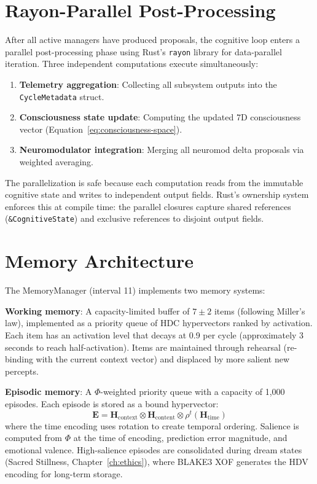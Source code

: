 \documentclass[12pt]{book}
\newcommand{\bind}{\otimes}
\begin{document}
\section{Rayon-Parallel Post-Processing}

After all active managers have produced proposals, the cognitive loop enters a parallel post-processing phase using Rust's \texttt{rayon} library for data-parallel iteration. Three independent computations execute simultaneously:

\begin{enumerate}
  \item \textbf{Telemetry aggregation}: Collecting all subsystem outputs into the \texttt{CycleMetadata} struct.
  \item \textbf{Consciousness state update}: Computing the updated 7D consciousness vector (Equation~\ref{eq:consciousness-space}).
  \item \textbf{Neuromodulator integration}: Merging all neuromod delta proposals via weighted averaging.
\end{enumerate}

The parallelization is safe because each computation reads from the immutable cognitive state and writes to independent output fields. Rust's ownership system enforces this at compile time: the parallel closures capture shared references (\texttt{\&CognitiveState}) and exclusive references to disjoint output fields.

\section{Memory Architecture}

The MemoryManager (interval 11) implements two memory systems:

\textbf{Working memory}: A capacity-limited buffer of $7 \pm 2$ items (following Miller's law), implemented as a priority queue of HDC hypervectors ranked by activation. Each item has an activation level that decays at 0.9 per cycle (approximately 3 seconds to reach half-activation). Items are maintained through rehearsal (re-binding with the current context vector) and displaced by more salient new percepts.

\textbf{Episodic memory}: A $\Phi$-weighted priority queue with a capacity of 1,000 episodes. Each episode is stored as a bound hypervector:
\begin{equation}
\mathbf{E} = \mathbf{H}_{\text{context}} \bind \mathbf{H}_{\text{content}} \bind \rho^t(\mathbf{H}_{\text{time}})
\end{equation}
where the time encoding uses rotation to create temporal ordering. Salience is computed from $\Phi$ at the time of encoding, prediction error magnitude, and emotional valence. High-salience episodes are consolidated during dream states (Sacred Stillness, Chapter~\ref{ch:ethics}), where BLAKE3 XOF generates the HDV encoding for long-term storage.
\end{document}
